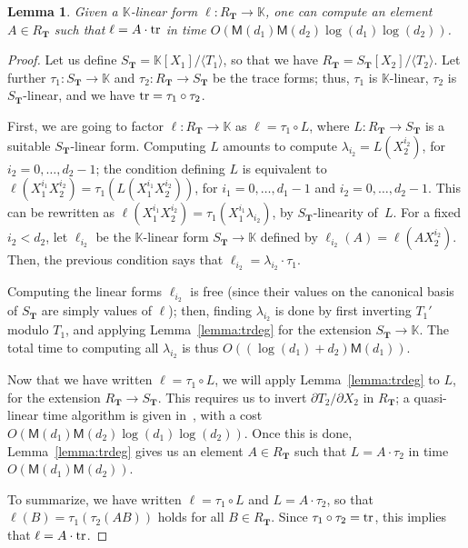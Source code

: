 \documentclass[12pt]{article}
\def\K {\ensuremath{\mathbb{K}}}
\def\M {\ensuremath{\mathsf{M}}}
\def\Tt {\ensuremath{\mathbf{T}}}
\newtheorem{Lemma}{Lemma}
\begin{document}
\begin{Lemma}\label{lemma:trdeg2}
  Given a $\K$-linear form $\ell:R_\Tt \to \K$, one can compute an
  element $A \in R_\Tt$ such that $\ell = A\cdot {\rm tr}$ in time
  $O(\M(d_1)\M(d_2)\log(d_1)\log(d_2))$.
\end{Lemma}
\begin{proof}
  Let us define $S_\Tt = \K[X_1]/\langle T_1\rangle$, so that we have
  $R_\Tt =S_\Tt[X_2]/\langle T_2\rangle$. Let further $\tau_1:S_\Tt\to
  \K$ and $\tau_2:R_\Tt \to S_\Tt$ be the trace forms; thus, $\tau_1$
  is $\K$-linear, $\tau_2$ is $S_\Tt$-linear, and we have ${\rm
    tr}=\tau_1 \circ \tau_2$.

  First, we are going to factor $\ell: R_\Tt \to \K$ as $\ell =
  \tau_1 \circ L$, where $L:R_\Tt \to S_\Tt$ is a suitable
  $S_\Tt$-linear form. Computing $L$ amounts to compute
  $\lambda_{i_2}=L(X_2^{i_2})$, for $i_2=0,\dots,d_2-1$; the condition
  defining $L$ is equivalent to $\ell(X_1^{i_1}
  X_2^{i_2})=\tau_1(L(X_1^{i_1} X_2^{i_2}))$, for $i_1=0,\dots,d_1-1$
  and $i_2=0,\dots,d_2-1$. This can be rewritten as $\ell(X_1^{i_1}
  X_2^{i_2})=\tau_1(X_1^{i_1}\lambda_{i_2})$, by $S_\Tt$-linearity
  of~$L$. For a fixed $i_2 < d_2$, let $\ell_{i_2}$ be the $\K$-linear
  form $S_\Tt \to \K$ defined by $\ell_{i_2}(A)=\ell(A X_2^{i_2})$.
  Then, the previous condition says that $\ell_{i_2} = \lambda_{i_2}
  \cdot \tau_1$.

  Computing the linear forms $\ell_{i_2}$ is free (since their values
  on the canonical basis of $S_\Tt$ are simply values of $\ell$);
  then, finding $\lambda_{i_2}$ is done by first inverting $T_1'$
  modulo $T_1$, and applying Lemma~\ref{lemma:trdeg} for the extension
  $S_\Tt \to \K$. The total time to computing all $\lambda_{i_2}$ is
  thus $O((\log(d_1)+d_2) \M(d_1))$.

  Now that we have written $\ell = \tau_1 \circ L$, we will apply
  Lemma~\ref{lemma:trdeg} to $L$, for the extension $R_\Tt \to S_\Tt$.
  This requires us to invert $\partial T_2/\partial X_2$ in $R_\Tt$; a
  quasi-linear time algorithm is given in~\cite{AcCoMa03}, with a cost
  $O(\M(d_1)\M(d_2) \log(d_1)\log(d_2))$. Once this is done,
  Lemma~\ref{lemma:trdeg} gives us an element $A \in R_\Tt$ such that
  $L=A\cdot \tau_2$ in time $O(\M(d_1)\M(d_2))$.

  To summarize, we have written $\ell = \tau_1 \circ L$ and $L=A\cdot
  \tau_2$, so that $\ell(B) = \tau_1 (\tau_2(AB))$ holds for all $B
  \in R_\Tt$. Since $\tau_1 \circ \tau_2 = {\rm tr}$, this implies that 
  $\ell = A \cdot {\rm tr}$.
\end{proof}
\end{document}
